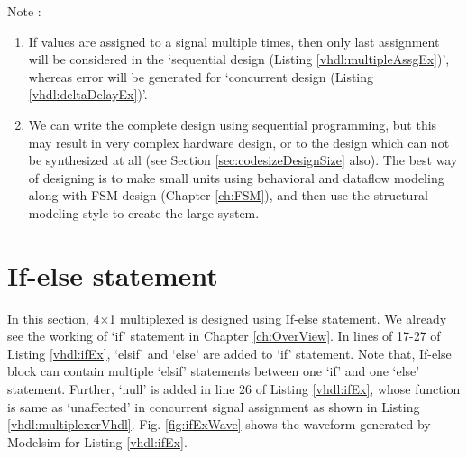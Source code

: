 \begin{noNumBox}
	Note :
	\begin{enumerate}
		\item If values are assigned to a signal multiple times, then only last assignment will be considered in the `sequential design (Listing \ref{vhdl:multipleAssgEx})', whereas error will be generated for `concurrent design (Listing \ref{vhdl:deltaDelayEx})'. 
		\item We can write the complete design using sequential programming, but this may result in very complex hardware design, or to the design which can not be synthesized at all (see Section \ref{sec:codesizeDesignSize} also). The best way of designing is to make small units using behavioral and dataflow modeling along with FSM design (Chapter \ref{ch:FSM}), and then use the structural modeling style to create the large system. 
	\end{enumerate}
\end{noNumBox}

\section{If-else statement}
In this section, 4$\times$1 multiplexed is designed using If-else statement. We already see the working of `if' statement in Chapter \ref{ch:OverView}. In lines of 17-27 of Listing \ref{vhdl:ifEx}, `elsif' and `else' are added to `if' statement. Note that, If-else block can contain multiple `elsif' statements between one `if' and one `else' statement. Further, `null' is added in line 26 of Listing \ref{vhdl:ifEx}, whose function is same as `unaffected' in concurrent signal assignment as shown in Listing \ref{vhdl:multiplexerVhdl}. Fig. \ref{fig:ifExWave} shows the waveform generated by Modelsim for Listing \ref{vhdl:ifEx}. 

